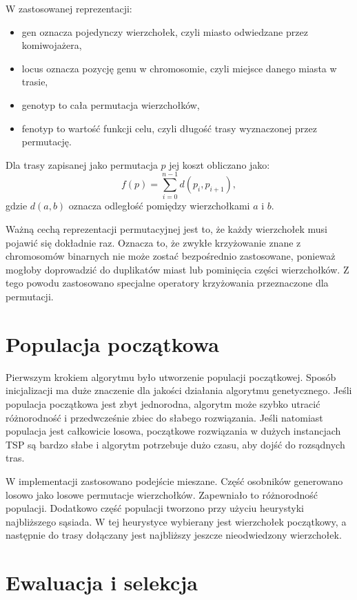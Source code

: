 \documentclass[12pt,a4paper]{article}
\begin{document}
W zastosowanej reprezentacji:
\begin{itemize}
    \item gen oznacza pojedynczy wierzchołek, czyli miasto odwiedzane przez komiwojażera,
    \item locus oznacza pozycję genu w chromosomie, czyli miejsce danego miasta w trasie,
    \item genotyp to cała permutacja wierzchołków,
    \item fenotyp to wartość funkcji celu, czyli długość trasy wyznaczonej przez permutację.
\end{itemize}

Dla trasy zapisanej jako permutacja $p$ jej koszt obliczano jako:
\[
    f(p) = \sum_{i=0}^{n-1} d(p_i, p_{i+1}),
\]
gdzie $d(a,b)$ oznacza odległość pomiędzy wierzchołkami $a$ i $b$.

Ważną cechą reprezentacji permutacyjnej jest to, że każdy wierzchołek musi pojawić się dokładnie raz. Oznacza to, że zwykłe krzyżowanie znane z chromosomów binarnych nie może zostać bezpośrednio zastosowane, ponieważ mogłoby doprowadzić do duplikatów miast lub pominięcia części wierzchołków. Z tego powodu zastosowano specjalne operatory krzyżowania przeznaczone dla permutacji.

\section{Populacja początkowa}

Pierwszym krokiem algorytmu było utworzenie populacji początkowej. Sposób inicjalizacji ma duże znaczenie dla jakości działania algorytmu genetycznego. Jeśli populacja początkowa jest zbyt jednorodna, algorytm może szybko utracić różnorodność i przedwcześnie zbiec do słabego rozwiązania. Jeśli natomiast populacja jest całkowicie losowa, początkowe rozwiązania w dużych instancjach TSP są bardzo słabe i algorytm potrzebuje dużo czasu, aby dojść do rozsądnych tras.

W implementacji zastosowano podejście mieszane. Część osobników generowano losowo jako losowe permutacje wierzchołków. Zapewniało to różnorodność populacji. Dodatkowo część populacji tworzono przy użyciu heurystyki najbliższego sąsiada. W tej heurystyce wybierany jest wierzchołek początkowy, a następnie do trasy dołączany jest najbliższy jeszcze nieodwiedzony wierzchołek. 

\section{Ewaluacja i selekcja}
\end{document}
